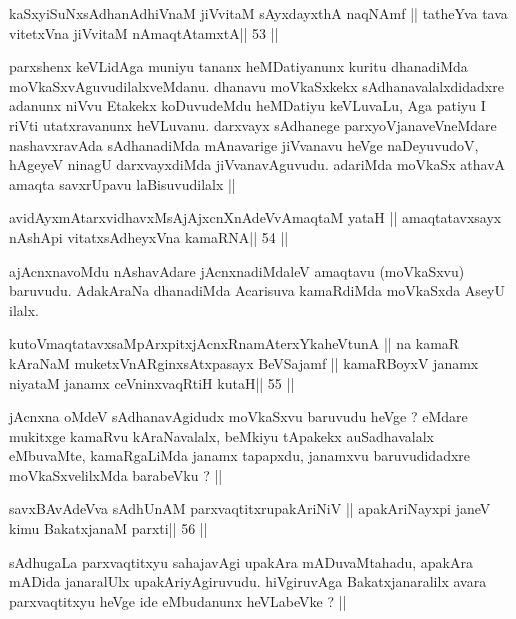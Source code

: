 \begin{shl}
kaSxyiSuNxsAdhanAdhiVnaM jiVvitaM sAyxdayxthA naqNAmf ||
tatheYva tava vitetxVna jiVvitaM nAmaqtAtamxtA\hfill || 53 ||
\end{shl}

\begin{artha}
parxshenx keVLidAga muniyu tananx heMDatiyanunx kuritu dhanadiMda
moVkaSxvAguvudilalxveMdanu. dhanavu moVkaSxkekx sAdhanavalalxdidadxre
adanunx niVvu Etakekx koDuvudeMdu heMDatiyu keVLuvaLu, Aga patiyu I
riVti utatxravanunx heVLuvanu. darxvayx sAdhanege parxyoVjanaveVneMdare 
nashavxravAda sAdhanadiMda mAnavarige jiVvanavu heVge naDeyuvudoV,
hAgeyeV ninagU darxvayxdiMda jiVvanavAguvudu. adariMda moVkaSx athavA
amaqta savxrUpavu laBisuvudilalx ||
\end{artha}


\begin{shl}
avidAyxmAtarxvidhavxMsAjAjxcnXnAdeVvAmaqtaM yataH ||
amaqtatavxsayx nA\s\s shA\s pi vitatxsAdheyxVna kamaRNA\hfill || 54 ||
\end{shl}

\begin{artha}
ajAcnxnavoMdu nAshavAdare jAcnxnadiMdaleV amaqtavu (moVkaSxvu)
baruvudu. AdakAraNa dhanadiMda Acarisuva kamaRdiMda moVkaSxda AseyU 
ilalx.
\end{artha}

\begin{shl}
kutoV\s maqtatavxsaMpArxpitxjAcnxRnamAterxYkaheVtunA ||
na kamaR kAraNaM muketxVnARginxsAtxpasayx BeVSajamf ||
kamaRBoyxV janamx niyataM janamx ceVninxvaqRtiH kutaH\hfill || 55 ||
\end{shl}

\begin{artha}
jAcnxna oMdeV sAdhanavAgidudx moVkaSxvu baruvudu heVge ? eMdare 
mukitxge kamaRvu kAraNavalalx, beMkiyu tApakekx auSadhavalalx
eMbuvaMte, kamaRgaLiMda janamx tapapxdu, janamxvu baruvudidadxre
moVkaSxvelilxMda barabeVku ? ||
\end{artha}

\begin{shl}
savxBAvAdeVva sAdhUnAM parxvaqtitxrupakAriNiV ||
apakAriNayxpi janeV kimu BakatxjanaM parxti\hfill || 56 ||
\end{shl}

\begin{artha}
sAdhugaLa parxvaqtitxyu sahajavAgi upakAra mADuvaMtahadu, apakAra
mADida janaralUlx upakAriyAgiruvudu. hiVgiruvAga Bakatxjanaralilx
avara parxvaqtitxyu heVge ide eMbudanunx heVLabeVke ? ||
\end{artha}

